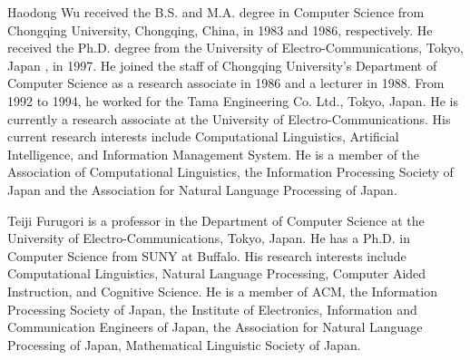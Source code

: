 \begin{biography}

\biotitle{}

{
Haodong Wu received the B.S.  and M.A. degree in 
Computer Science 
from Chongqing University, Chongqing, China, in 1983 and 1986, respectively.
He received the Ph.D. degree from the University of Electro-Communications, Tokyo, Japan
, in 1997. He joined the staff of Chongqing University's Department of Computer
Science as a research associate in 1986 and a lecturer in 1988. From 1992 to
1994, he worked for the Tama Engineering Co. Ltd., Tokyo, Japan. He is currently
a research associate at the University of Electro-Communications. 
His current research interests include Computational Linguistics,
Artificial Intelligence, and Information Management System. He is
a member of the Association of Computational Linguistics, 
the Information Processing Society of Japan and the 
Association for Natural Language Processing of Japan.
 
}

{
Teiji Furugori is a professor in the Department of Computer Science at the University of
Electro-Communications, Tokyo, Japan. He has a Ph.D. in Computer Science from SUNY at
Buffalo. His research interests include Computational Linguistics, Natural Language
Processing, Computer Aided Instruction, and Cognitive Science. He is a member of ACM,
the Information Processing Society of Japan, the Institute of Electronics, Information 
and Communication Engineers of Japan, the Association for Natural Language Processing
of Japan, Mathematical Linguistic Society of Japan. 

}



\end{biography}


